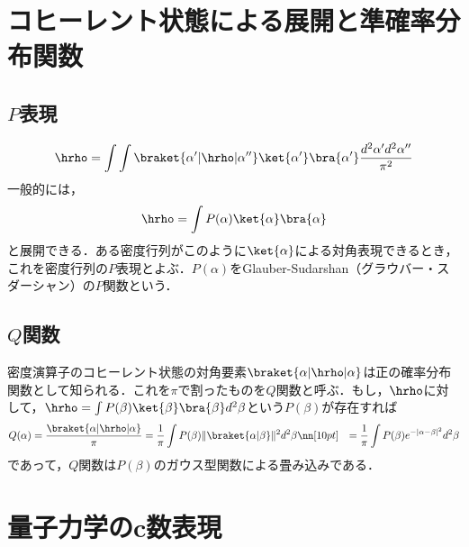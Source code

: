 
\section{コヒーレント状態による展開と準確率分布関数}
\subsection{$P$表現}
\begin{equation}
    \hrho=\int\int\braket{\alpha'|\hrho|\alpha''}\ket{\alpha'}\bra{\alpha'}\frac{d^2\alpha'd^2\alpha''}{\pi^2}
\end{equation}
一般的には，
\begin{equation}
    \hrho=\int P(\alpha)\ket{\alpha}\bra{\alpha}
\end{equation}
と展開できる．ある密度行列がこのように$\ket{\alpha}$による対角表現できるとき，これを密度行列の$P$表現とよぶ．$P(\alpha)$をGlauber-Sudarshan（グラウバー・スダーシャン）の$P$関数という．


\subsection{$Q$関数}
密度演算子のコヒーレント状態の対角要素$\braket{\alpha|\hrho|\alpha}$は正の確率分布関数として知られる．これを$\pi$で割ったものを$Q$関数と呼ぶ．もし，$\hrho$に対して，$\hrho=\int P(\beta)\ket{\beta}\bra{\beta}d^2\beta$という$P(\beta)$が存在すれば
\begin{align}
    Q(\alpha)&=\frac{\braket{\alpha|\hrho|\alpha}}{\pi}=\frac{1}{\pi}\int P(\beta)\|\braket{\alpha|\beta}\|^2 d^2\beta\nn[10pt]
    &=\frac{1}{\pi}\int P(\beta)e^{-|\alpha-\beta|^2}d^2\beta
\end{align}
であって，$Q$関数は$P(\beta)$のガウス型関数による畳み込みである．

\section{量子力学のc数表現}
